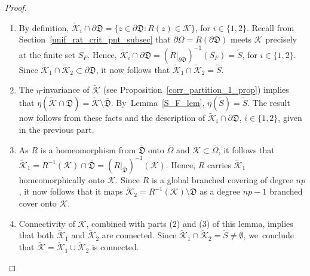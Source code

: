 \documentclass[JEP,XML,SOM,Unicode,NoFloatCountersInSection,published]{cedram}
\theoremstyle{definition}
\theoremstyle{remark}
\newcommand{\cK}{\mathcal{K}}
\begin{document}
\skpt
\begin{proof}
\begin{enumerate}
\item
By definition, $\widetilde{\cK}_i\cap\partial\mathfrak{D}=\{z\in\partial\mathfrak{D}: R(z)\in\cK\}$, for $i\in\{1,2\}$. Recall from Section~\ref{unif_rat_crit_pnt_subsec} that $\partial\Omega=R(\partial\mathfrak{D})$ meets $\cK$ precisely at the finite set $S_F$. Hence, \hbox{$\widetilde{\cK}_i\cap\partial\mathfrak{D}=(R\vert_{\partial\mathfrak{D}})^{-1}(S_F)=\widetilde{S}$}, for $i\in\{1,2\}$. Since $\widetilde{\mathcal{K}}_1\cap\widetilde{\mathcal{K}}_2\subset\partial\mathfrak{D}$, it now follows that $\widetilde{\mathcal{K}}_1\cap\widetilde{\mathcal{K}}_2 =\widetilde{S}$.

\item
The $\eta$-invariance of $\widetilde{\mathcal{K}}$ (see Proposition~\ref{corr_partition_1_prop}) implies that $\eta(\widetilde{\cK}\cap\mathfrak{D})=\widetilde{\cK}\setminus\overline{\mathfrak{D}}$. By~Lemma~\ref{S_F_lem}, $\eta(\widetilde{S})=\widetilde{S}$. The result now follows from these facts and the description of $\widetilde{\cK}_i\cap\partial\mathfrak{D}$, $i\in\{1,2\}$, given in the previous part.

\item
As $R$ is a homeomorphism from $\overline{\mathfrak{D}}$ onto $\overline{\Omega}$ and $\cK\subset\overline{\Omega}$, it follows that $\widetilde{\mathcal{K}}_1=R^{-1}(\mathcal{K})\cap\overline{\mathfrak{D}}=(R\vert_{\overline{\mathfrak{D}}})^{-1}(\cK)$. Hence, $R$ carries $\widetilde{\cK}_1$ homeomorphically onto $\cK$. Since $R$ is a global branched covering of degree $np$, it now follows that it maps $\widetilde{\cK}_2=R^{-1}(\cK)\setminus\mathfrak{D}$ as a degree $np-1$ branched cover onto $\mathcal{K}$.

\item
Connectivity of $\cK$, combined with parts (2) and (3) of this lemma, implies that both $\widetilde{\cK}_1$ and $\widetilde{\cK}_2$ are connected. Since $\widetilde{\mathcal{K}}_1\cap\widetilde{\mathcal{K}}_2=\widetilde{S}\neq\emptyset$, we~conclude that $\widetilde{\cK}=\widetilde{\mathcal{K}}_1\cup\widetilde{\mathcal{K}}_2$ is connected.
\qedhere
\end{enumerate}
\end{proof}
\end{document}

